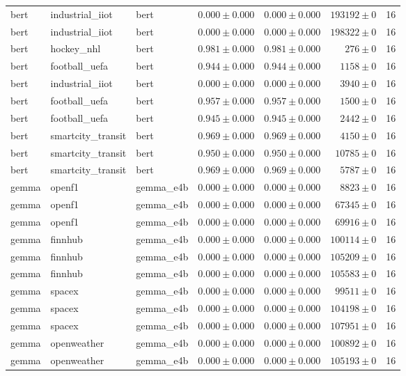 \begin{table}[htbp]
\begin{tabular}{l l l r r r r}
bert & industrial\_iiot & bert & $0.000\pm0.000$ & $0.000\pm0.000$ & $193192\pm0$ & 16 \\
bert & industrial\_iiot & bert & $0.000\pm0.000$ & $0.000\pm0.000$ & $198322\pm0$ & 16 \\
bert & hockey\_nhl & bert & $0.981\pm0.000$ & $0.981\pm0.000$ & $276\pm0$ & 16 \\
bert & football\_uefa & bert & $0.944\pm0.000$ & $0.944\pm0.000$ & $1158\pm0$ & 16 \\
bert & industrial\_iiot & bert & $0.000\pm0.000$ & $0.000\pm0.000$ & $3940\pm0$ & 16 \\
bert & football\_uefa & bert & $0.957\pm0.000$ & $0.957\pm0.000$ & $1500\pm0$ & 16 \\
bert & football\_uefa & bert & $0.945\pm0.000$ & $0.945\pm0.000$ & $2442\pm0$ & 16 \\
bert & smartcity\_transit & bert & $0.969\pm0.000$ & $0.969\pm0.000$ & $4150\pm0$ & 16 \\
bert & smartcity\_transit & bert & $0.950\pm0.000$ & $0.950\pm0.000$ & $10785\pm0$ & 16 \\
bert & smartcity\_transit & bert & $0.969\pm0.000$ & $0.969\pm0.000$ & $5787\pm0$ & 16 \\
gemma & openf1 & gemma\_e4b & $0.000\pm0.000$ & $0.000\pm0.000$ & $8823\pm0$ & 16 \\
gemma & openf1 & gemma\_e4b & $0.000\pm0.000$ & $0.000\pm0.000$ & $67345\pm0$ & 16 \\
gemma & openf1 & gemma\_e4b & $0.000\pm0.000$ & $0.000\pm0.000$ & $69916\pm0$ & 16 \\
gemma & finnhub & gemma\_e4b & $0.000\pm0.000$ & $0.000\pm0.000$ & $100114\pm0$ & 16 \\
gemma & finnhub & gemma\_e4b & $0.000\pm0.000$ & $0.000\pm0.000$ & $105209\pm0$ & 16 \\
gemma & finnhub & gemma\_e4b & $0.000\pm0.000$ & $0.000\pm0.000$ & $105583\pm0$ & 16 \\
gemma & spacex & gemma\_e4b & $0.000\pm0.000$ & $0.000\pm0.000$ & $99511\pm0$ & 16 \\
gemma & spacex & gemma\_e4b & $0.000\pm0.000$ & $0.000\pm0.000$ & $104198\pm0$ & 16 \\
gemma & spacex & gemma\_e4b & $0.000\pm0.000$ & $0.000\pm0.000$ & $107951\pm0$ & 16 \\
gemma & openweather & gemma\_e4b & $0.000\pm0.000$ & $0.000\pm0.000$ & $100892\pm0$ & 16 \\
gemma & openweather & gemma\_e4b & $0.000\pm0.000$ & $0.000\pm0.000$ & $105193\pm0$ & 16 \\

\end{tabular}
\end{table}
